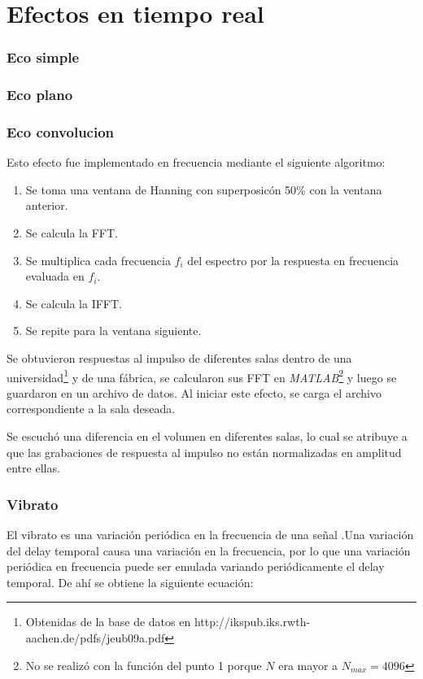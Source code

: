 \documentclass[../ASSD_TP2.tex]{subfiles}
\begin{document}
\section*{Efectos en tiempo real}
\subsubsection*{Eco simple}
\subsubsection*{Eco plano}
\subsubsection*{Eco convolucion}
Esto efecto fue implementado en frecuencia mediante el siguiente algoritmo:

\begin{enumerate}
	\item Se toma una ventana de Hanning con superposic\'on 50\% con la ventana anterior.
	\item Se calcula la FFT.
	\item Se multiplica cada frecuencia $f_i$ del espectro por la respuesta en frecuencia evaluada en $f_i$.
	\item Se calcula la IFFT.
	\item Se repite para la ventana siguiente.
\end{enumerate}

Se obtuvieron respuestas al impulso de diferentes salas dentro de una universidad\footnote{Obtenidas de la base de datos en http://ikspub.iks.rwth-aachen.de/pdfs/jeub09a.pdf} y de una f\'abrica, se calcularon sus FFT en \textit{MATLAB}\footnote{No se realiz\'o con la funci\'on del punto 1 porque $N$ era mayor a $N_{max} = 4096$} y luego se guardaron en un archivo de datos. Al iniciar este efecto, se carga el archivo correspondiente a la sala deseada.


Se escuch\'o una diferencia en el volumen en diferentes salas, lo cual se atribuye a que las grabaciones de respuesta al impulso no est\'an normalizadas en amplitud entre ellas.

\subsubsection*{Vibrato}
El vibrato es una variaci\'on peri\'odica en la frecuencia de una se\~nal .Una variaci\'on del delay temporal causa una variaci\'on en la frecuencia, por lo que una variaci\'on peri\'odica en frecuencia puede ser emulada variando peri\'odicamente el delay temporal. De ah\'i se obtiene la siguiente ecuaci\'on:
\end{document}
